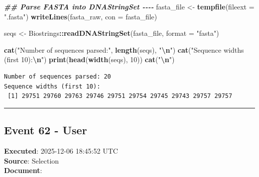 \documentclass[
  11pt,
]{article}
\newenvironment{Shaded}{\begin{snugshade}}{\end{snugshade}}
\newcommand{\AttributeTok}[1]{\textcolor[rgb]{0.13,0.29,0.53}{#1}}
\newcommand{\DecValTok}[1]{\textcolor[rgb]{0.00,0.00,0.81}{#1}}
\newcommand{\DocumentationTok}[1]{\textcolor[rgb]{0.56,0.35,0.01}{\textbf{\textit{#1}}}}
\newcommand{\FunctionTok}[1]{\textcolor[rgb]{0.13,0.29,0.53}{\textbf{#1}}}
\newcommand{\NormalTok}[1]{#1}
\newcommand{\OtherTok}[1]{\textcolor[rgb]{0.56,0.35,0.01}{#1}}
\newcommand{\SpecialCharTok}[1]{\textcolor[rgb]{0.81,0.36,0.00}{\textbf{#1}}}
\newcommand{\StringTok}[1]{\textcolor[rgb]{0.31,0.60,0.02}{#1}}
\newenvironment{rpoutput}{\vspace{0.5em}\begin{snugshade}}{\end{snugshade}}
\begin{document}
\begin{Shaded}
\begin{Highlighting}[]
\DocumentationTok{\#\# Parse FASTA into DNAStringSet {-}{-}{-}{-}}
\NormalTok{fasta\_file }\OtherTok{\textless{}{-}} \FunctionTok{tempfile}\NormalTok{(}\AttributeTok{fileext =} \StringTok{".fasta"}\NormalTok{)}
\FunctionTok{writeLines}\NormalTok{(fasta\_raw, }\AttributeTok{con =}\NormalTok{ fasta\_file)}

\NormalTok{seqs }\OtherTok{\textless{}{-}}\NormalTok{ Biostrings}\SpecialCharTok{::}\FunctionTok{readDNAStringSet}\NormalTok{(fasta\_file, }\AttributeTok{format =} \StringTok{"fasta"}\NormalTok{)}

\FunctionTok{cat}\NormalTok{(}\StringTok{"Number of sequences parsed:"}\NormalTok{, }\FunctionTok{length}\NormalTok{(seqs), }\StringTok{"}\SpecialCharTok{\textbackslash{}n}\StringTok{"}\NormalTok{)}
\FunctionTok{cat}\NormalTok{(}\StringTok{"Sequence widths (first 10):}\SpecialCharTok{\textbackslash{}n}\StringTok{"}\NormalTok{)}
\FunctionTok{print}\NormalTok{(}\FunctionTok{head}\NormalTok{(}\FunctionTok{width}\NormalTok{(seqs), }\DecValTok{10}\NormalTok{))}
\FunctionTok{cat}\NormalTok{(}\StringTok{"}\SpecialCharTok{\textbackslash{}n}\StringTok{"}\NormalTok{)}
\end{Highlighting}
\end{Shaded}

\begin{rpoutput}

\begin{verbatim}
Number of sequences parsed: 20 
Sequence widths (first 10):
 [1] 29751 29760 29763 29746 29751 29754 29745 29743 29757 29757
\end{verbatim}

\end{rpoutput}

\begin{center}\rule{0.5\linewidth}{0.5pt}\end{center}

\subsection{Event 62 - User}\label{event-62---user}

\textbf{Executed}: 2025-12-06 18:45:52 UTC\\
\textbf{Source}: Selection\\
\textbf{Document}:
\end{document}
